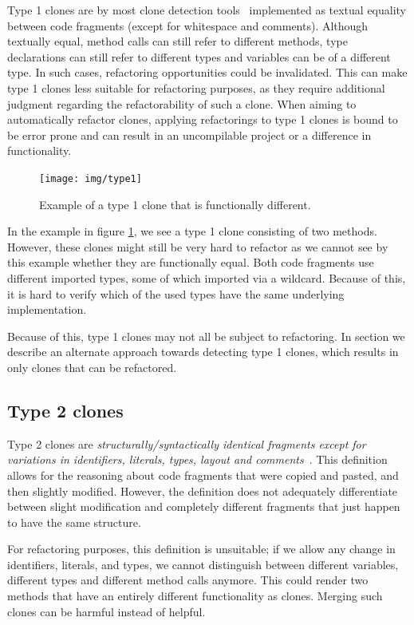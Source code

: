 Type 1 clones are by most clone detection tools~\cite{kamiya2002ccfinder, semura2017ccfindersw, roy2008nicad, svajlenko2016bigcloneeval, svajlenko2014evaluating} implemented as textual equality between code fragments (except for whitespace and comments). Although textually equal, method calls can still refer to different methods, type declarations can still refer to different types and variables can be of a different type. In such cases, refactoring opportunities could be invalidated. This can make type 1 clones less suitable for refactoring purposes, as they require additional judgment regarding the refactorability of such a clone. When aiming to automatically refactor clones, applying refactorings to type 1 clones is bound to be error prone and can result in an uncompilable project or a difference in functionality.

\begin{figure}[H]
  \texttt{[image: img/type1]}
  \caption{Example of a type 1 clone that is functionally different.}
  \label{fig:type1}
\end{figure}

In the example in figure \ref{fig:type1}, we see a type 1 clone consisting of two methods. However, these clones might still be very hard to refactor as we cannot see by this example whether they are functionally equal. Both code fragments use different imported types, some of which imported via a wildcard. Because of this, it is hard to verify which of the used types have the same underlying implementation.

Because of this, type 1 clones may not all be subject to refactoring. In section \label{chap:type1rclones} we describe an alternate approach towards detecting type 1 clones, which results in only clones that can be refactored.

\subsection{Type 2 clones}\label{sec:type2}
Type 2 clones are \textit{structurally/syntactically identical fragments except for variations in identifiers, literals, types, layout and comments}~\cite{roy2007survey}. This definition allows for the reasoning about code fragments that were copied and pasted, and then slightly modified. However, the definition does not adequately differentiate between slight modification and completely different fragments that just happen to have the same structure.

For refactoring purposes, this definition is unsuitable; if we allow any change in identifiers, literals, and types, we cannot distinguish between different variables, different types and different method calls anymore. This could render two methods that have an entirely different functionality as clones. Merging such clones can be harmful instead of helpful.

